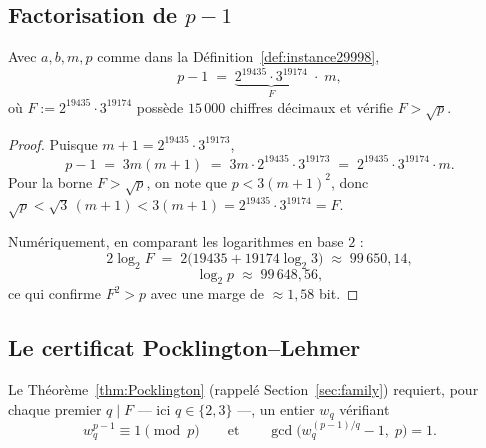 \subsection{Factorisation de $p-1$}

\begin{rigorousbox}
\begin{lemma}[Factorisation de $p-1$]\label{lem:factorisation29998}
Avec $a, b, m, p$ comme dans la Définition~\ref{def:instance29998},
\[
  p - 1 \;=\; \underbrace{2^{19435}\cdot 3^{19174}}_{F}
              \;\cdot\; m,
\]
où $F := 2^{19435}\cdot 3^{19174}$ possède $15\,000$ chiffres décimaux et
vérifie $F > \sqrt{p}$.
\end{lemma}
\end{rigorousbox}

\begin{proof}
Puisque $m + 1 = 2^{19435}\cdot 3^{19173}$,
\[
  p - 1 \;=\; 3m(m+1) \;=\; 3m\cdot 2^{19435}\cdot 3^{19173}
           \;=\; 2^{19435}\cdot 3^{19174}\cdot m.
\]
Pour la borne $F > \sqrt{p}$, on note que $p < 3(m+1)^2$, donc
$\sqrt{p} < \sqrt{3}\,(m+1) < 3(m+1) = 2^{19435}\cdot 3^{19174} = F$.

\noindent Numériquement, en comparant les logarithmes en base $2$ :
\[
  2\log_2 F
  \;=\; 2\bigl(19435 + 19174\log_2 3\bigr)
  \;\approx\; 99\,650{,}14,
\]
\[
  \log_2 p \;\approx\; 99\,648{,}56,
\]
ce qui confirme $F^2 > p$ avec une marge de $\approx 1{,}58$ bit.
\end{proof}

\subsection{Le certificat Pocklington–Lehmer}

Le Théorème~\ref{thm:Pocklington} (rappelé Section~\ref{sec:family})
requiert, pour chaque premier $q \mid F$ — ici $q \in \{2, 3\}$ —, un entier
$w_q$ vérifiant
\[
  w_q^{p-1} \equiv 1 \pmod{p}
  \qquad\text{et}\qquad
  \gcd\!\bigl(w_q^{(p-1)/q} - 1,\; p\bigr) = 1.
\]

